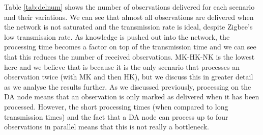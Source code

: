  Table \ref{tab:delnum} shows the number of observations delivered for each scenario and their variations. We can see that almost all observations are delivered when the network is not saturated and the transmission rate is ideal, despite Zigbee's low transmission rate. As knowledge is pushed out into the network, the processing time becomes a factor on top of the transmission time and we can see that this reduces the number of received observations. MK-HK-NK is the lowest here and we believe that is because it is the only scenario that processes an observation twice (with MK and then HK), but we discuss this in greater detail as we analyse the results further. As we discussed previously, processing on the DA node means that an observation is only marked as delivered when it has been processed. However, the short processing times (when compared to long transmission times) and the fact that a DA node can process up to four observations in parallel means that this is not really a bottleneck.
 
